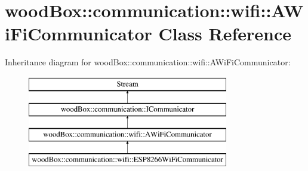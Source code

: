 \hypertarget{classwood_box_1_1communication_1_1wifi_1_1_a_wi_fi_communicator}{}\section{wood\+Box\+:\+:communication\+:\+:wifi\+:\+:A\+Wi\+Fi\+Communicator Class Reference}
\label{classwood_box_1_1communication_1_1wifi_1_1_a_wi_fi_communicator}
Inheritance diagram for wood\+Box\+:\+:communication\+:\+:wifi\+:\+:A\+Wi\+Fi\+Communicator\+:\begin{figure}[H]
\begin{center}
\leavevmode
\includegraphics[height=4.000000cm]{classwood_box_1_1communication_1_1wifi_1_1_a_wi_fi_communicator}
\end{center}
\end{figure}
